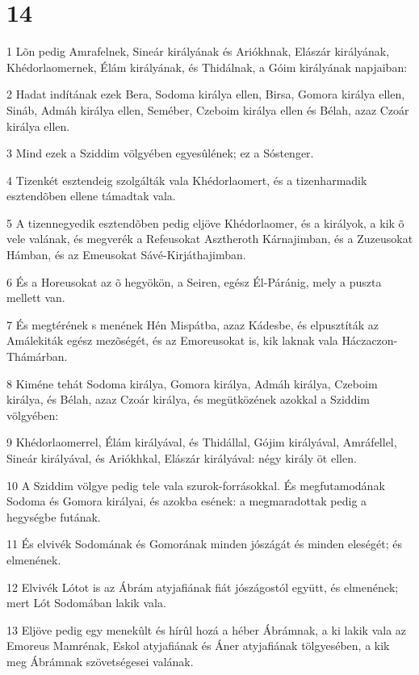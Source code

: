 \chapter{14}

\par 1 Lõn pedig Amrafelnek, Sineár királyának és Ariókhnak, Elászár királyának, Khédorlaomernek, Élám királyának, és Thidálnak, a Góim királyának napjaiban:
\par 2 Hadat indítának ezek Bera, Sodoma királya ellen, Birsa, Gomora királya ellen, Sináb, Admáh királya ellen, Seméber, Czeboim királya ellen és Bélah, azaz Czoár királya ellen.
\par 3 Mind ezek a Sziddim völgyében egyesûlének; ez a Sóstenger.
\par 4 Tizenkét esztendeig szolgálták vala Khédorlaomert, és a tizenharmadik esztendõben ellene támadtak vala.
\par 5 A tizennegyedik esztendõben pedig eljöve Khédorlaomer, és a királyok, a kik õ vele valának, és megverék a Refeusokat Asztheroth Kárnajimban, és a Zuzeusokat Hámban, és az Emeusokat Sávé-Kirjáthajimban.
\par 6 És a Horeusokat az õ hegyökön, a Seiren, egész Él-Páránig, mely a puszta mellett van.
\par 7 És megtérének s menének Hén Mispátba, azaz Kádesbe, és elpusztíták az Amálekiták egész mezõségét, és az Emoreusokat is, kik laknak vala Háczaczon-Thámárban.
\par 8 Kiméne tehát Sodoma királya, Gomora királya, Admáh királya, Czeboim királya, és Bélah, azaz Czoár királya, és megütközének azokkal a Sziddim völgyében:
\par 9 Khédorlaomerrel, Élám királyával, és Thidállal, Gójim királyával, Amráfellel, Sineár királyával, és Ariókhkal, Elászár királyával: négy király öt ellen.
\par 10 A Sziddim völgye pedig tele vala szurok-forrásokkal. És megfutamodának Sodoma és Gomora királyai, és azokba esének: a megmaradottak pedig a hegységbe futának.
\par 11 És elvivék Sodomának és Gomorának minden jószágát és minden eleségét; és elmenének.
\par 12 Elvivék Lótot is az Ábrám atyjafiának fiát jószágostól együtt, és elmenének; mert Lót Sodomában lakik vala.
\par 13 Eljöve pedig egy menekûlt és hírûl hozá a héber Ábrámnak, a ki lakik vala az Emoreus Mamrénak, Eskol atyjafiának és Áner atyjafiának tölgyesében, a kik meg Ábrámnak szövetségesei valának.
